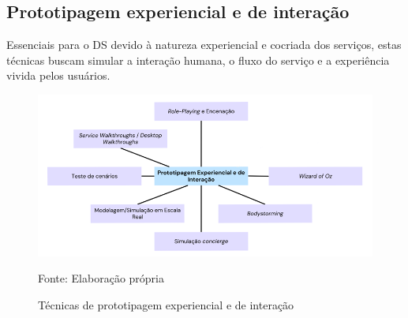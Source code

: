 \subsection{Prototipagem experiencial e de interação}

Essenciais para o DS devido à natureza experiencial e cocriada dos serviços, estas técnicas buscam simular a interação humana, o fluxo do serviço e a experiência vivida pelos usuários.

\begin{figure}[H]
	\centering
	\includegraphics[width=1\linewidth]{figuras/experiencial-interacao}
	\caption{Técnicas de prototipagem experiencial e de interação}
	Fonte: Elaboração própria
	\label{fig:categorias-prototipacao}
\end{figure}

